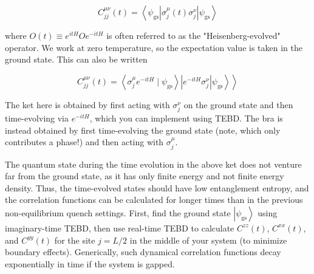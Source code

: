 \documentclass[12pt]{article}
\begin{document}
\begin{equation*}
C_{j j}^{\mu \nu}(t)=\left\langle\psi_{\mathrm{gs}}\left|\sigma_{j}^{\mu}(t) \sigma_{j}^{\nu}\right| \psi_{\mathrm{gs}}\right\rangle \tag{24}
\end{equation*}


where $O(t) \equiv e^{i t H} O e^{-i t H}$ is often referred to as the "Heisenberg-evolved" operator. We work at zero temperature, so the expectation value is taken in the ground state. This can also be written


\begin{equation*}
\left.\left.C_{j j}^{\mu \nu}(t)=\left\langle\sigma_{j}^{\mu} e^{-i t H} \mid \psi_{\mathrm{gs}}\right\rangle\left|e^{-i t H} \sigma_{j}^{\nu}\right| \psi_{\mathrm{gs}}\right\rangle\right\rangle \tag{25}
\end{equation*}


The ket here is obtained by first acting with $\sigma_{j}^{\nu}$ on the ground state and then time-evolving via $e^{-i t H}$, which you can implement using TEBD. The bra is instead obtained by first time-evolving the ground state (note, which only contributes a phase!) and then acting with $\sigma_{j}^{\mu}$.

The quantum state during the time evolution in the above ket does not venture far from the ground state, as it has only finite energy and not finite energy density. Thus, the time-evolved states should have low entanglement entropy, and the correlation functions can be calculated for longer times than in the previous non-equilibrium quench settings. First, find the ground state $\left|\psi_{\mathrm{gs}}\right\rangle$ using imaginary-time TEBD, then use real-time TEBD to calculate $C^{zz}(t)$, $C^{xx}(t)$, and $C^{yy}(t)$ for the site $j=L/2$ in the middle of your system (to minimize boundary effects). Generically, such dynamical correlation functions decay exponentially in time if the system is gapped.
\end{document}
